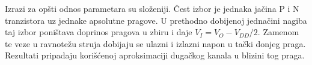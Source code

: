 Izrazi za opšti odnos parametara su složeniji. Čest izbor je jednaka jačina P i N tranzistora uz jednake apsolutne pragove. U prethodno dobijenoj jednačini nagiba taj izbor poništava doprinos pragova u zbiru i daje $V_I=V_O-V_{DD}/2$. Zamenom te veze u ravnotežu struja dobijaju se ulazni i izlazni napon u tački donjeg praga. Rezultati pripadaju korišćenoj aproksimaciji dugačkog kanala u blizini tog praga.
